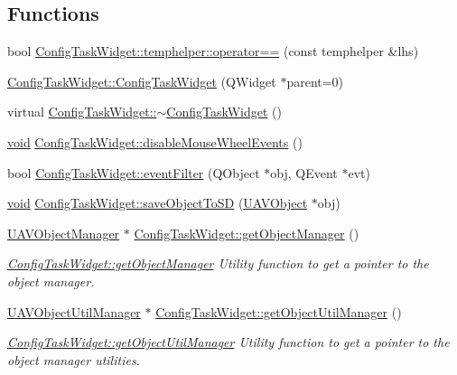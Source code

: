 \subsection*{\-Functions}
\begin{DoxyCompactItemize}
\item 
bool \hyperlink{group___u_a_v_object_widget_utils_gaf38e83f721ec231506c2aa0bd3268280}{\-Config\-Task\-Widget\-::temphelper\-::operator==} (const temphelper \&lhs)
\item 
\hyperlink{group___u_a_v_object_widget_utils_ga8164338f4928bd3afd984eeda276f276}{\-Config\-Task\-Widget\-::\-Config\-Task\-Widget} (\-Q\-Widget $\ast$parent=0)
\item 
virtual \hyperlink{group___u_a_v_object_widget_utils_ga40fc17c487f66c2cbcd9aa678c6f20dd}{\-Config\-Task\-Widget\-::$\sim$\-Config\-Task\-Widget} ()
\item 
\hyperlink{group___u_a_v_objects_plugin_ga444cf2ff3f0ecbe028adce838d373f5c}{void} \hyperlink{group___u_a_v_object_widget_utils_gaf42e971c9cd69919e3b05ed25643d516}{\-Config\-Task\-Widget\-::disable\-Mouse\-Wheel\-Events} ()
\item 
bool \hyperlink{group___u_a_v_object_widget_utils_gae5859445d40d8a43d5fd91927dd56ba9}{\-Config\-Task\-Widget\-::event\-Filter} (\-Q\-Object $\ast$obj, \-Q\-Event $\ast$evt)
\item 
\hyperlink{group___u_a_v_objects_plugin_ga444cf2ff3f0ecbe028adce838d373f5c}{void} \hyperlink{group___u_a_v_object_widget_utils_ga48cc77073a67c1e1945a0625f27d1519}{\-Config\-Task\-Widget\-::save\-Object\-To\-S\-D} (\hyperlink{class_u_a_v_object}{\-U\-A\-V\-Object} $\ast$obj)
\item 
\hyperlink{class_u_a_v_object_manager}{\-U\-A\-V\-Object\-Manager} $\ast$ \hyperlink{group___u_a_v_object_widget_utils_ga516ee05a73ac3c7c9e6132b0d7294b4a}{\-Config\-Task\-Widget\-::get\-Object\-Manager} ()
\begin{DoxyCompactList}\small\item\em \hyperlink{group___u_a_v_object_widget_utils_ga516ee05a73ac3c7c9e6132b0d7294b4a}{\-Config\-Task\-Widget\-::get\-Object\-Manager} \-Utility function to get a pointer to the object manager. \end{DoxyCompactList}\item 
\hyperlink{class_u_a_v_object_util_manager}{\-U\-A\-V\-Object\-Util\-Manager} $\ast$ \hyperlink{group___u_a_v_object_widget_utils_gadefdec77400ea7aaed02de03fa044b7a}{\-Config\-Task\-Widget\-::get\-Object\-Util\-Manager} ()
\begin{DoxyCompactList}\small\item\em \hyperlink{group___u_a_v_object_widget_utils_gadefdec77400ea7aaed02de03fa044b7a}{\-Config\-Task\-Widget\-::get\-Object\-Util\-Manager} \-Utility function to get a pointer to the object manager utilities. \end{DoxyCompactList}\item 

\end{DoxyCompactItemize}
